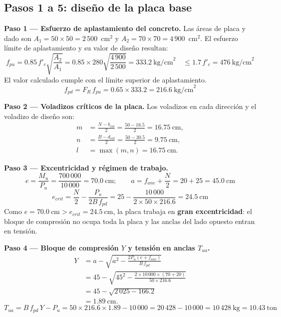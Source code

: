 \subsection{Pasos 1 a 5: diseño de la placa base}

\textbf{Paso 1 — Esfuerzo de aplastamiento del concreto.}
Las áreas de placa y dado son $A_1 = 50\times50 = 2\,500$~cm$^2$ y
$A_2 = 70\times70 = 4\,900$~cm$^2$. El esfuerzo límite de aplastamiento y su valor de
diseño resultan:
\begin{equation*}
  f_{pu} = 0.85\,f'_c\sqrt{\frac{A_2}{A_1}}
         = 0.85 \times 280\sqrt{\frac{4\,900}{2\,500}}
         = 333.2~\text{kg/cm}^2
         \quad \leq 1.7\,f'_c = 476~\text{kg/cm}^2
\end{equation*}
El valor calculado cumple con el límite superior de aplastamiento.
\begin{equation*}
  f_{pd} = F_R\,f_{pu} = 0.65 \times 333.2 = 216.6~\text{kg/cm}^2
\end{equation*}

\textbf{Paso 2 — Voladizos críticos de la placa.}
Los voladizos en cada dirección y el voladizo de diseño son:
\begin{align*}
  m &= \frac{N - b_{col}}{2}
     = \frac{50 - 16.5}{2}
     = 16.75~\text{cm},\\
  n &= \frac{B - d_{col}}{2}
     = \frac{50 - 30.5}{2}
     = 9.75~\text{cm},\\
  l &= \max(m,n)
     = 16.75~\text{cm}.
\end{align*}

\textbf{Paso 3 — Excentricidad y régimen de trabajo.}
\begin{equation*}
  e = \frac{M_u}{P_u} = \frac{700\,000}{10\,000} = 70.0~\text{cm}; \qquad
  a = f_{anc} + \frac{N}{2} = 20 + 25 = 45.0~\text{cm}
\end{equation*}
\begin{equation*}
  e_{crit} = \frac{N}{2} - \frac{P_u}{2B\,f_{pd}}
           = 25 - \frac{10\,000}{2\times50\times216.6}
           = 24.5~\text{cm}
\end{equation*}
Como $e = 70.0~\text{cm} > e_{crit} = 24.5~\text{cm}$, la placa trabaja en
\textbf{gran excentricidad}: el bloque de compresión no ocupa toda la placa y las anclas
del lado opuesto entran en tensión.

\textbf{Paso 4 — Bloque de compresión $Y$ y tensión en anclas $T_{ua}$.}
\begin{align*}
  Y
    &= a - \sqrt{a^2 - \frac{2P_u(e + f_{anc})}{B\,f_{pd}}}\\
    &= 45 - \sqrt{45^2 - \frac{2\times10\,000\times(70+20)}{50\times216.6}}\\
    &= 45 - \sqrt{2\,025 - 166.2}\\
    &= 1.89~\text{cm}.
\end{align*}
\begin{equation*}
  T_{ua} = B\,f_{pd}\,Y - P_u = 50\times216.6\times1.89 - 10\,000
         = 20\,428 - 10\,000 = 10\,428~\text{kg} = 10.43~\text{ton}
\end{equation*}

